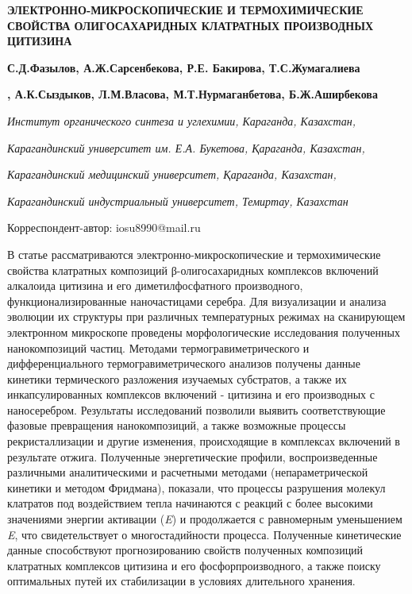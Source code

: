 
{\bfseries ЭЛЕКТРОННО-МИКРОСКОПИЧЕСКИЕ И ТЕРМОХИМИЧЕСКИЕ СВОЙСТВА
ОЛИГОСАХАРИДНЫХ КЛАТРАТНЫХ ПРОИЗВОДНЫХ ЦИТИЗИНА}

{\bfseries {}С.Д.Фазылов}{\bfseries \envelope ,
А.Ж.Сарсенбекова}{\bfseries ,
Р.Е.
Бакирова}{\bfseries ,
Т.С.Жумагалиева}

{\bfseries ,
А.К.Сыздыков}{\bfseries ,
Л.М.Власова}{\bfseries ,
М.Т.Нурмаганбетова}{\bfseries ,
Б.Ж.Аширбекова}

\emph{Институт органического синтеза и углехимии,
Караганда, Казахстан,}

\emph{Карагандинский университет им. Е.А. Букетова,
Қараганда, Казахстан,}

\emph{Карагандинский медицинский университет,
Қараганда, Казахстан,}

\emph{Карагандинский индустриальный университет,
Темиртау, Казахстан}

\envelope Корреспондент-автор:
iosu8990@mail.ru

В статье рассматриваются электронно-микроскопические и термохимические
свойства клатратных композиций β-олигосахаридных комплексов включений
алкалоида цитизина и его диметилфосфатного производного,
функционализированные наночастицами серебра. Для визуализации и анализа
эволюции их структуры при различных температурных режимах на сканирующем
электронном микроскопе проведены морфологические исследования полученных
нанокомпозиций частиц. Методами термогравиметрического и
дифференциального термогравиметрического анализов получены данные
кинетики термического разложения изучаемых субстратов, а также их
инкапсулированных комплексов включений - цитизина и его производных с
наносеребром. Результаты исследований позволили выявить соответствующие
фазовые превращения нанокомпозиций, а также возможные процессы
рекристаллизации и другие изменения, происходящие в комплексах включений
в результате отжига. Полученные энергетические профили, воспроизведенные
различными аналитическими и расчетными методами (непараметрической
кинетики и методом Фридмана), показали, что процессы разрушения молекул
клатратов под воздействием тепла начинаются с реакций с более высокими
значениями энергии активации (\emph{E}) и продолжается
с равномерным уменьшением \emph{E}, что свидетельствует
о многостадийности процесса. Полученные кинетические данные способствуют
прогнозированию свойств полученных композиций клатратных комплексов
цитизина и его фосфорпроизводного, а также поиску оптимальных путей их
стабилизации в условиях длительного хранения.

